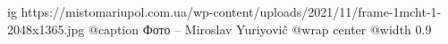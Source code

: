  
 
 
 
 

\ifcmt
  ig https://mistomariupol.com.ua/wp-content/uploads/2021/11/frame-1mcht-1-2048x1365.jpg
	@caption Фото – Miroslav Yuriyoviĉ
  @wrap center
  @width 0.9
\fi
